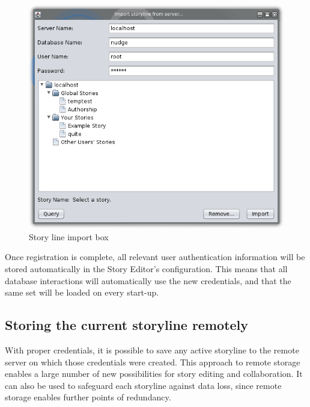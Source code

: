 \documentclass[12pt,letterpaper]{article}
\begin{document}
\begin{figure}
    \begin{center}
        \includegraphics[scale=1]{importwindow.png}
    \end{center}
    \caption{Story line import box}
\end{figure}

Once registration is complete, all relevant user authentication information will be stored automatically in the Story Editor's
configuration. This means that all database interactions will automatically use the new credentials, and that the same 
set will be loaded on every start-up.\footnotemark


\subsection{Storing the current storyline remotely}
With proper credentials, it is possible to save any active storyline to the remote server on which those credentials
were created. This approach to remote storage enables a large number of new possibilities for story editing and collaboration.
It can also be used to safeguard each storyline against data loss, since remote storage enables further points of redundancy.
\end{document}
